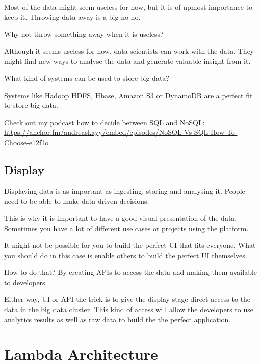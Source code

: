 \documentclass[12pt, numbers=noenddot]{scrreprt} %
\begin{document}
Most of the data might seem useless for now, but it is of upmost importance to keep it. Throwing data away is a big no no.

Why not throw something away when it is useless?

Although it seems useless for now, data scientists can work with the data. They might find new ways to analyse the data and generate valuable insight from it.

What kind of systems can be used to store big data?

Systems like Hadoop HDFS, Hbase, Amazon S3 or DynamoDB are a perfect fit to store big data.

Check out my podcast how to decide between SQL and NoSQL: \url{https://anchor.fm/andreaskayy/embed/episodes/NoSQL-Vs-SQL-How-To-Choose-e12f1o}

\section{Display}
Displaying data is as important as ingesting, storing and analysing it. People need to be able to make data driven decisions.

This is why it is important to have a good visual presentation of the data. Sometimes you have a lot of different use cases or projects using the platform.

It might not be possible for you to build the perfect UI that fits everyone. What you should do in this case is enable others to build the perfect UI themselves.

How to do that? By creating APIs to access the data and making them available to developers.

Either way, UI or API the trick is to give the display stage direct access to the data in the big data cluster. This kind of access will allow the developers to use analytics results as well as raw data to build the the perfect application.

\chapter{ Lambda Architecture}
\end{document}
